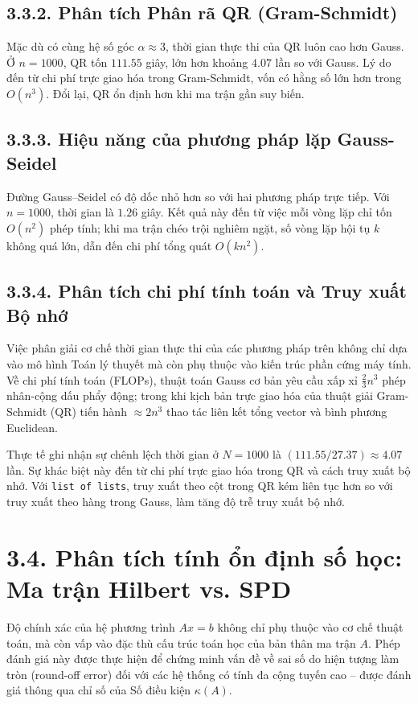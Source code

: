 \subsection*{3.3.2. Phân tích Phân rã QR (Gram-Schmidt)}
Mặc dù có cùng hệ số góc $\alpha \approx 3$, thời gian thực thi của QR luôn cao hơn Gauss. Ở $n=1000$, QR tốn $111.55$ giây, lớn hơn khoảng $4.07$ lần so với Gauss. Lý do đến từ chi phí trực giao hóa trong Gram-Schmidt, vốn có hằng số lớn hơn trong $O(n^3)$. Đổi lại, QR ổn định hơn khi ma trận gần suy biến.

\subsection*{3.3.3. Hiệu năng của phương pháp lặp Gauss-Seidel}
Đường Gauss--Seidel có độ dốc nhỏ hơn so với hai phương pháp trực tiếp. Với $n=1000$, thời gian là $1.26$ giây. Kết quả này đến từ việc mỗi vòng lặp chỉ tốn $O(n^2)$ phép tính; khi ma trận chéo trội nghiêm ngặt, số vòng lặp hội tụ $k$ không quá lớn, dẫn đến chi phí tổng quát $O(k n^2)$.

\subsection*{3.3.4. Phân tích chi phí tính toán và Truy xuất Bộ nhớ}
Việc phân giải cơ chế thời gian thực thi của các phương pháp trên không chỉ dựa vào mô hình Toán lý thuyết mà còn phụ thuộc vào kiến trúc phần cứng máy tính. Về chi phí tính toán (FLOPs), thuật toán Gauss cơ bản yêu cầu xấp xỉ $\frac{2}{3}n^3$ phép nhân-cộng dấu phẩy động; trong khi kịch bản trực giao hóa của thuật giải Gram-Schmidt (QR) tiến hành $\approx 2n^3$ thao tác liên kết tổng vector và bình phương Euclidean. 

Thực tế ghi nhận sự chênh lệch thời gian ở $N=1000$ là $(111.55/27.37) \approx 4.07$ lần. Sự khác biệt này đến từ chi phí trực giao hóa trong QR và cách truy xuất bộ nhớ. Với \texttt{list of lists}, truy xuất theo cột trong QR kém liên tục hơn so với truy xuất theo hàng trong Gauss, làm tăng độ trễ truy xuất bộ nhớ.
\section*{3.4. Phân tích tính ổn định số học: Ma trận Hilbert vs. SPD}
{}

Độ chính xác của hệ phương trình $Ax = b$ không chỉ phụ thuộc vào cơ chế thuật toán, mà còn vấp vào đặc thù cấu trúc toán học của bản thân ma trận $A$. Phép đánh giá này được thực hiện để chứng minh vấn đề về sai số do hiện tượng làm tròn (round-off error) đối với các hệ thống có tính đa cộng tuyến cao – được đánh giá thông qua chỉ số của Số điều kiện $\kappa(A)$.

